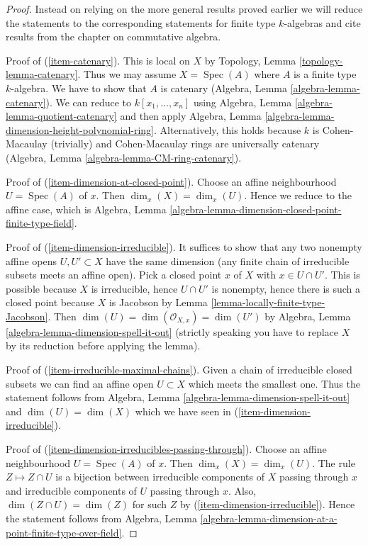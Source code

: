 \documentclass[10pt,a4paper]{amsart}
\theoremstyle{plain}
\theoremstyle{definition}
\theoremstyle{remark}
\numberwithin{equation}{subsection}
\def\Spec{\mathop{\mathrm{Spec}}}
\begin{document}
\begin{proof}
Instead on relying on the more general results proved earlier
we will reduce the statements to the corresponding statements
for finite type $k$-algebras and cite results from the chapter
on commutative algebra.

\medskip\noindent
Proof of (\ref{item-catenary}). This is local on $X$ by
Topology, Lemma \ref{topology-lemma-catenary}. Thus we may
assume $X = \Spec(A)$ where $A$ is a finite type $k$-algebra.
We have to show that $A$ is catenary
(Algebra, Lemma \ref{algebra-lemma-catenary}).
We can reduce to $k[x_1, \ldots, x_n]$ using
Algebra, Lemma \ref{algebra-lemma-quotient-catenary} and then apply
Algebra, Lemma \ref{algebra-lemma-dimension-height-polynomial-ring}.
Alternatively, this holds because $k$ is Cohen-Macaulay (trivially) and
Cohen-Macaulay rings are universally catenary
(Algebra, Lemma \ref{algebra-lemma-CM-ring-catenary}).

\medskip\noindent
Proof of (\ref{item-dimension-at-closed-point}). Choose an affine
neighbourhood $U = \Spec(A)$ of $x$. Then $\dim_x(X) = \dim_x(U)$.
Hence we reduce to the affine case, which is
Algebra, Lemma \ref{algebra-lemma-dimension-closed-point-finite-type-field}.

\medskip\noindent
Proof of (\ref{item-dimension-irreducible}). It suffices to show that
any two nonempty affine opens $U, U' \subset X$ have the same dimension
(any finite chain of irreducible subsets meets an affine open).
Pick a closed point $x$ of $X$ with $x \in U \cap U'$. This is possible
because $X$ is irreducible, hence $U \cap U'$ is nonempty, hence there is
such a closed point because $X$ is Jacobson by
Lemma \ref{lemma-locally-finite-type-Jacobson}. Then
$\dim(U) = \dim(\mathcal{O}_{X, x}) = \dim(U')$ by
Algebra, Lemma \ref{algebra-lemma-dimension-spell-it-out}
(strictly speaking you have to replace $X$ by its reduction before
applying the lemma).

\medskip\noindent
Proof of (\ref{item-irreducible-maximal-chains}). Given a chain
of irreducible closed subsets we can find an affine open $U \subset X$
which meets the smallest one. Thus the statement follows from
Algebra, Lemma \ref{algebra-lemma-dimension-spell-it-out} 
and $\dim(U) = \dim(X)$ which we have seen in
(\ref{item-dimension-irreducible}).

\medskip\noindent
Proof of (\ref{item-dimension-irreducibles-passing-through}).
Choose an affine neighbourhood $U = \Spec(A)$ of $x$. Then
$\dim_x(X) = \dim_x(U)$. The rule $Z \mapsto Z \cap U$
is a bijection between irreducible components of $X$ passing through
$x$ and irreducible components of $U$ passing through $x$.
Also, $\dim(Z \cap U) = \dim(Z)$ for such $Z$ by
(\ref{item-dimension-irreducible}).
Hence the statement follows from
Algebra, Lemma \ref{algebra-lemma-dimension-at-a-point-finite-type-over-field}.


\end{proof}
\end{document}
